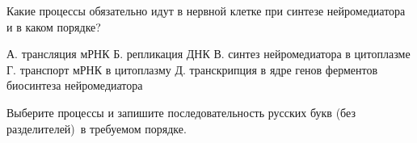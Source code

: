 
Какие процессы обязательно идут в нервной клетке при синтезе нейромедиатора и в каком порядке?

А. трансляция мРНК
Б. репликация ДНК
В. синтез нейромедиатора в цитоплазме
Г. транспорт мРНК в цитоплазму
Д. транскрипция в ядре генов ферментов биосинтеза нейромедиатора

Выберите процессы и запишите последовательность русских букв (без разделителей) в требуемом порядке.